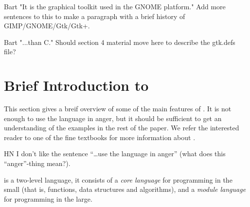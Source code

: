 \documentclass[workingdraft]{usetex-v1}
\begin{document}
\begin{ednote}{Bart}
     "It is the graphical toolkit used in the GNOME platform."  Add more
   sentences to this to make a paragraph with a brief history of
   GIMP/GNOME/Gtk/Gtk+.
\end{ednote}

\begin{ednote}{Bart}
     "...than C."  Should section 4 material move here to
   describe the gtk.defs file?

\end{ednote}





\section{Brief Introduction to \sml{}}
\label{sec:brief-intr-sml}

This section gives a breif overview of some of the main features of
\sml{}.  It is not enough to use the language in anger, but it should
be sufficient to get an understanding of the examples in the rest of
the paper.  We refer the interested reader to one of the fine textbooks
\cite{Hansen-Rischel:1999,Paulson:1996} for more information about \sml{}.

\begin{ednote}{HN}
I don't like the sentence ``\ldots use the language in anger'' (what
does this ``anger''-thing mean?).
\end{ednote}

\sml{} is a two-level language, it consists of a \emph{core language}
for programming in the small (that is, functions, data structures and
algorithms), and a \emph{module language} for programming in the large.
\end{document}
